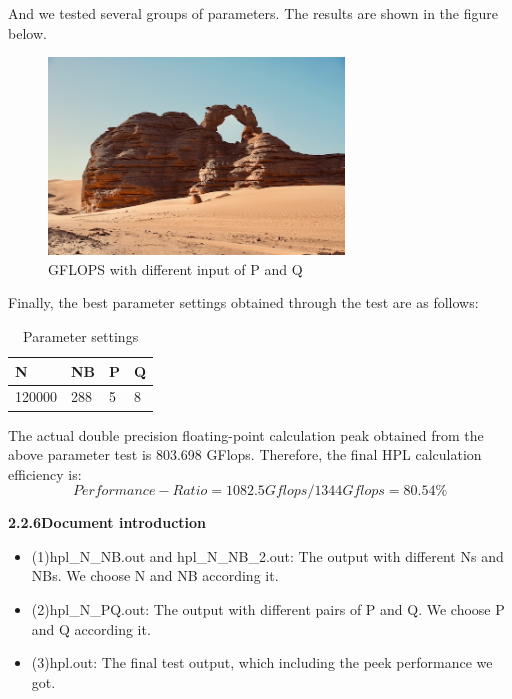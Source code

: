 \documentclass[a4paper,12pt]{article}
\begin{document}
And we tested several groups of parameters. The results are shown in the figure below.

\begin{figure}[H]
    \centering
    \includegraphics[width=0.7\textwidth]{GFLOPS_PQ_NB.png}
    \caption{GFLOPS with different input of P and Q}
    \label{fig:gflops_pq_nb}
\end{figure}

Finally, the best parameter settings obtained through the test are as follows:
\begin{table}[H]
\centering
\caption{Parameter settings}
\vspace{0.5cm}
\begin{tabular}{llll}
\toprule
N & NB & P & Q \\
\midrule
120000 & 288 & 5 & 8 \\
\bottomrule
\end{tabular}
\end{table}

The actual double precision floating-point calculation peak obtained from the above parameter test is 803.698 GFlops. Therefore, the final HPL calculation efficiency is:
\begin{equation*}
Performance-Ratio = 1082.5Gflops/1344Gflops = 80.54\%
\end{equation*}

\textbf{2.2.6Document introduction}
\begin{itemize}
    \item (1)hpl\_N\_NB.out and hpl\_N\_NB\_2.out: The output with different Ns and NBs. We choose N and NB according it.
    \item (2)hpl\_N\_PQ.out: The output with different pairs of P and Q. We choose P and Q according it.
    \item (3)hpl.out: The final test output, which including the peek performance we got.
\end{itemize}
\end{document}
